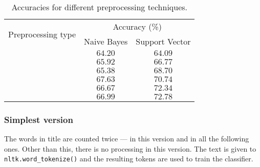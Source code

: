 \begin{table}[ht]
    \centering
    \caption{Accuracies for different preprocessing techniques.}
    \label{tab:bayes_table}
    \vspace{1em}
    \begin{tabular}[htpb]{c|c|c}
        \multirow{2}{*}{Preprocessing type} & \multicolumn{2}{c}{Accuracy (\%)} \\
        \cline{2-3}
                                            &
        Naive Bayes
                                            & Support Vector                    \\
        \hline\hline
        \nameref{sec:simple}
                                            & $64.20$
                                            & $64.09$                           \\
        \hline
        \nameref{sec:lowercase}
                                            & $65.92$
                                            & $66.77$                           \\
        \hline
        \nameref{sec:punctuation}
                                            & $65.38$
                                            & $68.70$                           \\
        \hline
        \nameref{sec:stopwords}
                                            & $67.63$
                                            & $70.74$                           \\
        \hline
        \nameref{sec:stemming}              & $66.67$
                                            & $72.34$                           \\
        \hline
        \nameref{sec:shortwords}            & $66.99$
                                            & $72.78$                           \\
    \end{tabular}
\end{table}

\subsubsection{Simplest version}
\label{sec:simple}

The words in title are counted twice --- in this version and in all the following ones. Other than this, there is no processing in this version. The text is given to \texttt{nltk.word_tokenize()} and the resulting tokens are used to train the classifier.


